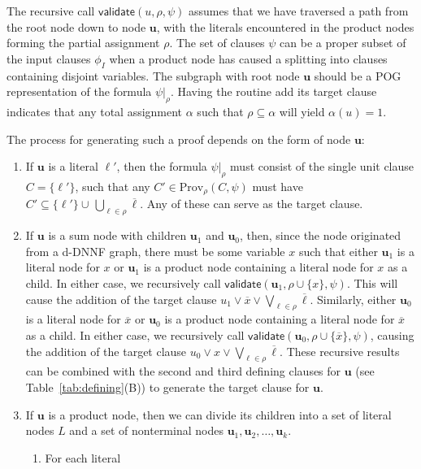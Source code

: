 \documentclass[letterpaper,USenglish,cleveref, autoref, thm-restate]{lipics-v2021}
\newcommand{\obar}[1]{\overline{#1}}
\newcommand{\lit}{\ell}
\newcommand{\assign}{\alpha}
\newcommand{\passign}{\rho}
\newcommand{\validate}{\textsf{validate}}
\newcommand{\prov}{\textrm{Prov}}
\newcommand{\inputformula}{\phi_I}
\newcommand{\makenode}[1]{\mathbf{#1}}
\newcommand{\nodeu}{\makenode{u}}
\newcommand{\simplify}[2]{#1|_{#2}}
\begin{document}
The recursive call $\validate(u, \passign, \psi)$ assumes that we have
traversed a path from the root node down to node $\nodeu$, with the
literals encountered in the product nodes forming the partial
assignment $\passign$.  The set of clauses $\psi$ can be a proper
subset of the input clauses $\inputformula$ when a product node has caused
a splitting into clauses containing disjoint variables.
The subgraph with root node $\nodeu$ should be a POG representation of the formula
$\simplify{\psi}{\passign}$.  Having the
routine add its target clause indicates that any total assignment
$\assign$ such that $\passign \subseteq \assign$ will yield $\alpha(u) = 1$.

The process for generating such a proof depends on the form of node $\nodeu$:
\begin{enumerate}
\item If $\nodeu$ is a literal $\lit'$, then the formula
  $\simplify{\psi}{\passign}$ must consist of the single unit clause
  $C = \{\lit'\}$, such that any $C' \in \prov_{\passign}(C, \psi)$ must have $C' \subseteq \{ \lit' \} \cup\, \bigcup_{\lit \in \passign} \obar{\lit}$.
  Any of these can
  serve as the target clause.
\item If $\nodeu$ is a sum node with children $\nodeu_1$ and $\nodeu_0$,
  then, since the node originated from a d-DNNF graph, there must be
  some variable $x$ such that either $\nodeu_1$ is a literal node for $x$ or $\nodeu_1$ is a
  product node containing a literal node for $x$ as a child.  In either case, we
  recursively call $\validate(\nodeu_1, \passign \cup \{ x \}, \psi)$.
  This will cause the addition of the target clause
  $u_1 \lor \obar{x} \lor \bigvee_{\lit \in \passign} \obar{\lit}$.
Similarly, either $\nodeu_0$ is a literal node for $\obar{x}$ or $\nodeu_0$ is a product node containing a literal node for $\obar{x}$ as
  a child.  In either case, we recursively call $\validate(\nodeu_0, \passign \cup \{ \obar{x} \}, \psi)$,
  causing the addition of the target clause
  $u_0 \lor x \lor \bigvee_{\lit \in \passign} \obar{\lit}$.
  These recursive results can be combined with the second and third defining clauses for $\nodeu$
(see Table~\ref{tab:defining}(B))
  to generate the target clause for $\nodeu$.
\item If $\nodeu$ is a product node, then we can divide its children
  into a set of literal nodes $L$ and a set of nonterminal nodes $\nodeu_1, \nodeu_2, \ldots, \nodeu_k$.
  \begin{enumerate}
    \item For each literal

\end{enumerate}
\end{enumerate}
\end{document}
